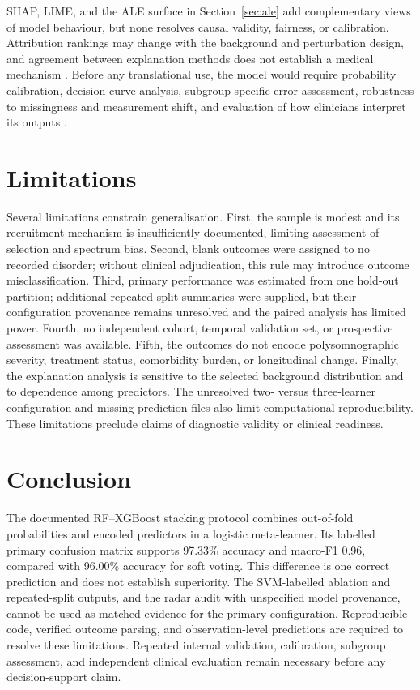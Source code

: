 \documentclass[a4paper,fleqn]{cas-dc}
\begin{document}
SHAP, LIME, and the ALE surface in Section~\ref{sec:ale} add complementary views of model behaviour, but none resolves causal validity, fairness, or calibration. Attribution rankings may change with the background and perturbation design, and agreement between explanation methods does not establish a medical mechanism \cite{instanceshap2023,jung2023,pesapane2026}. Before any translational use, the model would require probability calibration, decision-curve analysis, subgroup-specific error assessment, robustness to missingness and measurement shift, and evaluation of how clinicians interpret its outputs \cite{hu2024,tripodai2024,futureai2025}.


\section{Limitations}
Several limitations constrain generalisation. First, the sample is modest and its recruitment mechanism is insufficiently documented, limiting assessment of selection and spectrum bias. Second, blank outcomes were assigned to no recorded disorder; without clinical adjudication, this rule may introduce outcome misclassification. Third, primary performance was estimated from one hold-out partition; additional repeated-split summaries were supplied, but their configuration provenance remains unresolved and the paired analysis has limited power. Fourth, no independent cohort, temporal validation set, or prospective assessment was available. Fifth, the outcomes do not encode polysomnographic severity, treatment status, comorbidity burden, or longitudinal change. Finally, the explanation analysis is sensitive to the selected background distribution and to dependence among predictors. The unresolved two- versus three-learner configuration and missing prediction files also limit computational reproducibility. These limitations preclude claims of diagnostic validity or clinical readiness.

\section{Conclusion}
The documented RF--XGBoost stacking protocol combines out-of-fold probabilities and encoded predictors in a logistic meta-learner. Its labelled primary confusion matrix supports 97.33\% accuracy and macro-F1 0.96, compared with 96.00\% accuracy for soft voting. This difference is one correct prediction and does not establish superiority. The SVM-labelled ablation and repeated-split outputs, and the radar audit with unspecified model provenance, cannot be used as matched evidence for the primary configuration. Reproducible code, verified outcome parsing, and observation-level predictions are required to resolve these limitations. Repeated internal validation, calibration, subgroup assessment, and independent clinical evaluation remain necessary before any decision-support claim.
\end{document}
